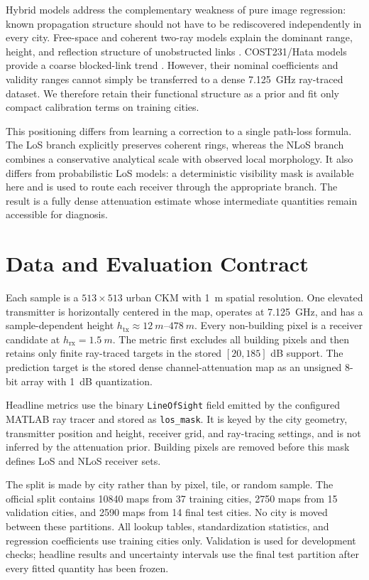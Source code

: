 \documentclass[10pt,conference]{IEEEtran}
\begin{document}
Hybrid models address the complementary weakness of pure image regression:
known propagation structure should not have to be rediscovered independently
in every city. Free-space and coherent two-ray models explain the dominant
range, height, and reflection structure of unobstructed links
\cite{rappaport,goldsmith,wocc2021}. COST231/Hata models provide a coarse
blocked-link trend \cite{cost231}. However, their nominal coefficients and validity
ranges cannot simply be transferred to a dense \SI{7.125}{GHz} ray-traced
dataset. We therefore retain their functional structure as a prior and fit
only compact calibration terms on training cities.

This positioning differs from learning a correction to a single path-loss
formula. The LoS branch explicitly preserves coherent rings, whereas the NLoS
branch combines a conservative analytical scale with observed local
morphology. It also differs from probabilistic LoS models: a deterministic
visibility mask is available here and is used to route each receiver through
the appropriate branch. The result is a fully dense attenuation estimate whose
intermediate quantities remain accessible for diagnosis.

\section{Data and Evaluation Contract}

Each sample is a $513\times513$ urban CKM with \SI{1}{m} spatial resolution.
One elevated transmitter is horizontally centered in the map, operates at
\SI{7.125}{GHz}, and has a sample-dependent height
$h_{\mathrm{tx}}\approx\SIrange{12}{478}{m}$. Every non-building pixel is a
receiver candidate at $h_{\mathrm{rx}}=\SI{1.5}{m}$. The metric first excludes
all building pixels and then retains only finite ray-traced targets in the
stored $[20,185]$ dB support. The prediction target is the stored dense
channel-attenuation map as an unsigned 8-bit array with \SI{1}{dB}
quantization.

Headline metrics use the binary \texttt{LineOfSight} field emitted by the
configured MATLAB ray tracer and stored as \texttt{los\_mask}. It is keyed by
the city geometry, transmitter position and height, receiver grid, and
ray-tracing settings, and is not inferred by the attenuation prior. Building
pixels are removed before this mask defines LoS and NLoS receiver sets.

The split is made by city rather than by pixel, tile, or random sample. The
official split contains 10840 maps from 37 training cities, 2750 maps from 15
validation cities, and 2590 maps from 14 final test cities. No city is moved
between these partitions. All lookup tables, standardization statistics, and
regression coefficients use training cities only. Validation is used for
development checks; headline results and uncertainty intervals use the final
test partition after every fitted quantity has been frozen.
\end{document}
